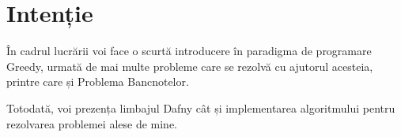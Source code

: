 \chapter*{Intenție} 

În cadrul lucrării voi face o scurtă introducere în paradigma de programare Greedy, urmată de mai multe probleme care se rezolvă cu ajutorul acesteia, printre care și Problema Bancnotelor.

Totodată, voi prezența limbajul Dafny cât și implementarea algoritmului pentru rezolvarea problemei alese de mine. 